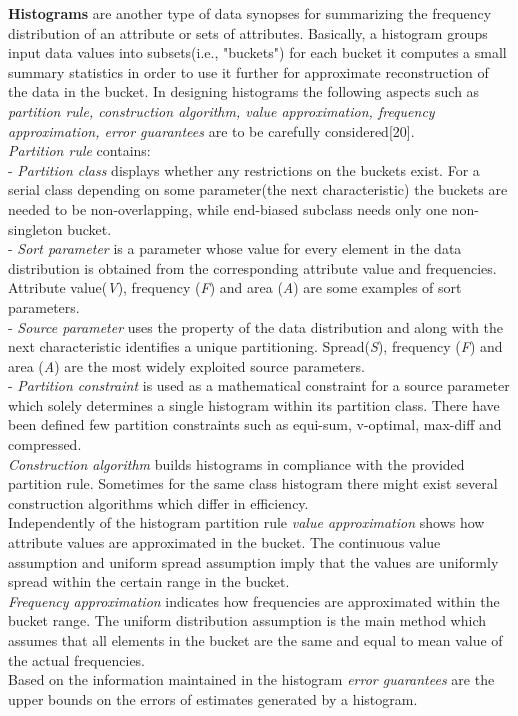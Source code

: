 \documentclass[10pt, conference, compsocconf]{IEEEtran}
\begin{document}
\textbf{Histograms} are another type of data synopses for summarizing the frequency distribution of an attribute or sets of attributes. Basically, a histogram groups input data values into subsets(i.e., "buckets") for each bucket it computes a small summary statistics in order to use it further for approximate reconstruction of the data in the bucket. In designing histograms the following aspects such as \textit{partition rule, construction algorithm, value approximation, frequency approximation, error guarantees} are to be carefully considered[20]. \\
\textit{Partition rule} contains: \\
- \textit{Partition class} displays whether any restrictions on the buckets exist. For a serial class depending on some parameter(the next characteristic) the buckets are needed to be non-overlapping, while end-biased subclass needs only one non-singleton bucket. \\
- \textit{Sort parameter} is a parameter whose value for every element in the data distribution is obtained from the corresponding attribute value and frequencies. Attribute value(\textit{V}), frequency (\textit{F}) and area (\textit{A}) are some examples of sort parameters.\\
- \textit{Source parameter} uses the property of the data distribution and along with the next characteristic identifies a unique partitioning. Spread(\textit{S}), frequency (\textit{F}) and area (\textit{A}) are the most widely exploited source parameters. \\
- \textit{Partition constraint} is used as a mathematical constraint for a source parameter which solely determines a single histogram within its partition class. There have been defined few partition constraints such as equi-sum, v-optimal, max-diff and compressed.\\
\textit{Construction algorithm} builds histograms in compliance with the provided partition rule. Sometimes for the same class histogram there might exist several construction algorithms which differ in efficiency. \\
Independently of the histogram partition rule \textit{value approximation} shows how attribute values are approximated in the bucket. The continuous value assumption and uniform spread assumption imply that the values are uniformly spread within the certain range in the bucket.\\
\textit{Frequency approximation} indicates how frequencies are approximated within the bucket range. The uniform distribution assumption is the main method which assumes that all elements in the bucket are the same and equal to mean value of the actual frequencies.\\
Based on the information maintained in the histogram \textit{error guarantees} are the upper bounds on the errors of estimates generated by a histogram.
\end{document}
